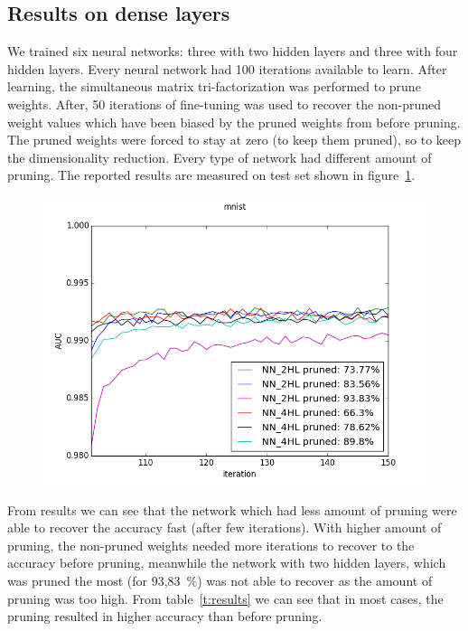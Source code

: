 \documentclass{article} %
\begin{document}
\subsection{Results on dense layers}
We trained six neural networks: 
three with two hidden layers and three with four 
hidden layers. Every neural network had 100 iterations available to learn. After 
learning, the simultaneous matrix tri-factorization was performed to prune 
weights. After, 50 iterations of fine-tuning was used to recover the non-pruned 
weight values which have been biased by the pruned weights from before 
pruning. The pruned weights were forced to stay at zero (to keep 
them pruned), so to keep the dimensionality reduction. 
Every type of network had different amount of pruning. 
The reported results are measured  on test set 
shown in figure~\ref{f:results}. 

\begin{figure}[!ht]
\centering
\includegraphics[width=0.8\linewidth]{mnist_new.png}
\label{f:results}
\end{figure}

From results we can see 
that the network which had less amount of pruning were able to recover the 
accuracy fast (after few iterations). With higher amount of pruning, 
the non-pruned weights needed more iterations to recover to the accuracy before 
pruning, meanwhile the network with two hidden layers, which was pruned the most 
(for 93,83~\%) was not able to recover as the amount of pruning was too high.
From table~\ref{t:results} we can see that in most cases, the pruning resulted
in higher accuracy than before pruning. 
\end{document}
